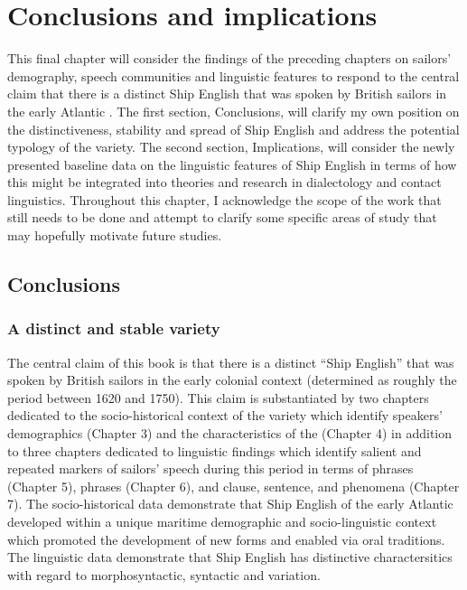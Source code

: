 \chapter{{Conclusions and implications}}\label{sec:8}

This final chapter will consider the findings of the preceding chapters on sailors’ demography, speech communities and linguistic features to respond to the central claim that there is a distinct Ship English that was spoken by British sailors in the early Atlantic . The first section, Conclusions, will clarify my own position on the distinctiveness, stability and spread of Ship English and address the potential typology of the variety. The second section, Implications, will consider the newly presented baseline data on the linguistic features of Ship English in terms of how this might be integrated into theories and research in dialectology and contact linguistics. Throughout this chapter, I acknowledge the scope of the work that still needs to be done and attempt to clarify some specific areas of study that may hopefully motivate future studies.

\section{{Conclusions}}%

\subsection{{A distinct and stable variety}}%

The central claim of this book is that there is a distinct “Ship English” that was spoken by British sailors in the early colonial context (determined as roughly the period between 1620 and 1750). This claim is substantiated by two chapters dedicated to the socio-historical context of the variety which identify speakers’ demographics (Chapter 3) and the characteristics of the  (Chapter 4) in addition to three chapters dedicated to linguistic findings which identify salient and repeated markers of sailors’ speech during this period in terms of  phrases (Chapter 5),  phrases (Chapter 6), and clause, sentence, and  phenomena (Chapter 7). The socio-historical data demonstrate that Ship English of the early Atlantic  developed within a unique maritime demographic and socio-linguistic context which promoted the development of new forms and enabled  via oral traditions. The linguistic data demonstrate that Ship English has distinctive charactersitics with regard to morphosyntactic, syntactic and  variation.

